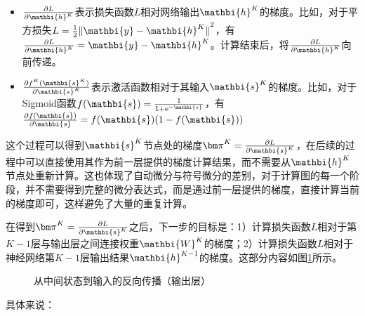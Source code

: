 \begin{spacing}{1.6}
\begin{itemize}
\vspace{0.5em}
\item $ \frac{\partial L}{\partial {\mathbi{h}}^K} $表示损失函数$ L $相对网络输出$ {\mathbi{h}}^K $的梯度。比如，对于平方损失$ L=\frac{1}{2}{\Vert {\mathbi{y}}-{\mathbi{h}}^K\Vert}^2 $，有$ \frac{\partial L}{\partial {\mathbi{h}}^K}= {\mathbi{y}} -{\mathbi{h}}^K $。计算结束后，将$ \frac{\partial L}{\partial {\mathbi{h}}^K} $向前传递。
\vspace{0.5em}
\item $ \frac{\partial f^K({\mathbi{s}}^K)}{\partial {\mathbi{s}}^K} $表示激活函数相对于其输入$ {\mathbi{s}}^K $的梯度。比如，对于Sigmoid函数$ f({\mathbi{s}})=\frac{1}{1+{\textrm e}^{- {\mathbi{s}}}}$，有$ \frac{\partial f({\mathbi{s}})}{\partial {\mathbi{s}}}=f({\mathbi{s}}) (1-f({\mathbi{s}}))$
\vspace{0.5em}
\end{itemize}
\end{spacing}

\parinterval  这个过程可以得到$ {\mathbi{s}}^K $节点处的梯度$ {\bm \pi}^K= \frac{\partial L}{\partial {\mathbi{s}}^K} $，在后续的过程中可以直接使用其作为前一层提供的梯度计算结果，而不需要从$ {\mathbi{h}}^K $节点处重新计算。这也体现了自动微分与符号微分的差别，对于计算图的每一个阶段，并不需要得到完整的微分表达式，而是通过前一层提供的梯度，直接计算当前的梯度即可，这样避免了大量的重复计算。

\parinterval  在得到$ {\bm \pi}^K= \frac{\partial L}{\partial {\mathbi{s}}^K} $之后，下一步的目标是：1）计算损失函数$ L $相对于第$ K-1 $层与输出层之间连接权重$ {\mathbi{W}}^K $的梯度；2）计算损失函数$ L $相对于神经网络第$ K-1 $层输出结果$ {\mathbi{h}}^{K-1} $的梯度。这部分内容如图\ref{fig:9-55}所示。

\begin{figure}[htp]
\centering

\caption{从中间状态到输入的反向传播（输出层）}
\label{fig:9-55}
\end{figure}

\noindent  具体来说：

